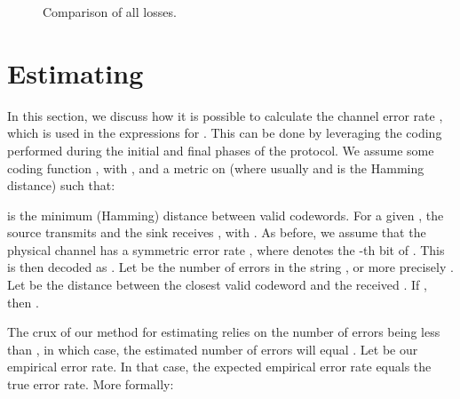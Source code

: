 \documentclass[a4paper]{article}
\theoremstyle{plain} \newtheorem{remark}{Remark}
\theoremstyle{plain} \newtheorem{definition}{Definition}
\theoremstyle{plain} \newtheorem{example}{Example}
\theoremstyle{plain} \newtheorem{assumption}{Assumption}
\theoremstyle{plain} \newtheorem{conjecture}{Conjecture}
\theoremstyle{plain} \newtheorem{theorem}{Theorem}
\theoremstyle{plain} \newtheorem{proposition}{Proposition}
\theoremstyle{plain} \newtheorem{lemma}{Lemma}
\theoremstyle{plain} \newtheorem{corollary}{Corollary}
\begin{document}
\begin{figure}
\centering
{}
\caption{Comparison of all losses.}
\label{fig:losses-rounds}
\end{figure}

\section{Estimating }
\label{sec:noise}
In this section, we discuss how it is possible to calculate the
channel error rate , which is used in the expressions for
. This can be done by leveraging the coding performed during
the initial and final phases of the protocol.  We assume some coding
function , with , and a metric
 on  (where usually  and  is the
Hamming distance) such that:

is the minimum (Hamming) distance between valid codewords.  For a
given , the source transmits  and the
sink receives , with .  As
before, we assume that the physical channel has a symmetric error rate
, where  denotes the
-th bit of .  This is then decoded as . Let  be
the number of errors in the string , or more precisely .  Let  be the distance between the
closest valid codeword  and the received
. If , then .




The crux of our method for estimating  relies on the number of
errors  being less than , in which case, the
estimated number of errors  will equal .  Let
 be our empirical error rate.
In that case, the expected empirical error rate equals the true error
rate. More formally:
\end{document}

